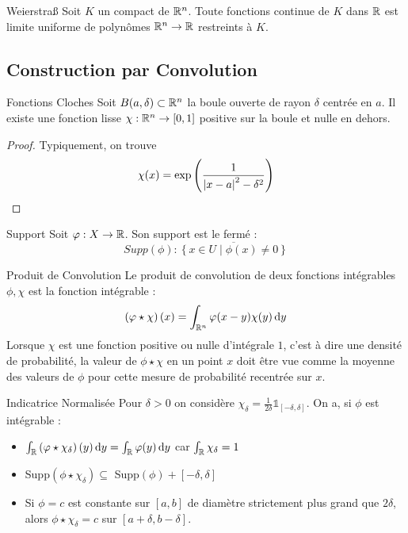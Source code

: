 \documentclass{cours}
\begin{document}
\begin{théorème}{Weierstraß}{}
    Soit $K$ un compact de $\mathbb{R}^{n}$. Toute fonctions continue de $K$ dans $\mathbb{R}$ est limite uniforme de polynômes $\mathbb{R}^{n} \to \mathbb{R}$ restreints à $K$. 
\end{théorème}

\subsection{Construction par Convolution}
\begin{propositionfr}{Fonctions Cloches}{}
    Soit $B(a, \delta) \subset \mathbb{R}^{n}$ la boule ouverte de rayon $\delta$ centrée en $a$. Il existe une fonction lisse $\chi : \mathbb{R}^{n} \to [0, 1]$ positive sur la boule et nulle en dehors.
\end{propositionfr}
\begin{proof}
    Typiquement, on trouve
    \[
        \chi(x) = \exp\left(\frac{1}{\left|x - a\right|^{2} - \delta^{2}}\right)
    \]
\end{proof}

\begin{définition}{Support}{}
    Soit $\varphi : X \to \mathbb{R}$. Son support est le fermé : 
    \[
        Supp (\phi) : \overline{\left\{x \in U \mid \phi(x) \neq 0\right\}}
    \]
\end{définition}

\begin{définition}{Produit de Convolution}{}
    Le produit de convolution de deux fonctions intégrables $\phi, \chi$ est la fonction intégrable : 
    \[
        \left(\varphi \star \chi\right)(x) = \int_{\mathbb{R}^{n}}\varphi(x - y)\chi(y) {\rm \, d} y
    \]
    Lorsque $\chi$ est une fonction positive ou nulle d'intégrale $1$, c'est à dire une densité de probabilité, la valeur de $\phi \star \chi$ en un point $x$ doit être vue comme la moyenne des valeurs de $\phi$ pour cette mesure de probabilité recentrée sur $x$. 
\end{définition}

\begin{propositionfr}{Indicatrice Normalisée}{}
    Pour $\delta > 0$ on considère $\chi_{\delta} = \frac{1}{2\delta}\mathds{1}_{[-\delta, \delta]}$. On a, si $\phi$ est intégrable : 
    \begin{itemize}
        \item $\int_{\mathbb{R}}\left(\varphi \star \chi_{\delta}\right)(y){\rm \, d} y = \int_{\mathbb{R}}\varphi(y){\rm \, d} y$ car $\int_{\mathbb{R}}\chi_{\delta} = 1$
        \item Supp$(\phi \star \chi_{\delta}) \subseteq$ Supp$(\phi) + [-\delta, \delta]$
        \item Si $\phi = c$ est constante sur $[a, b]$ de diamètre strictement plus grand que $2\delta$, alors $\phi \star \chi_{\delta} = c$ sur $[a + \delta, b - \delta]$.
    \end{itemize}
\end{propositionfr}
\end{document}
